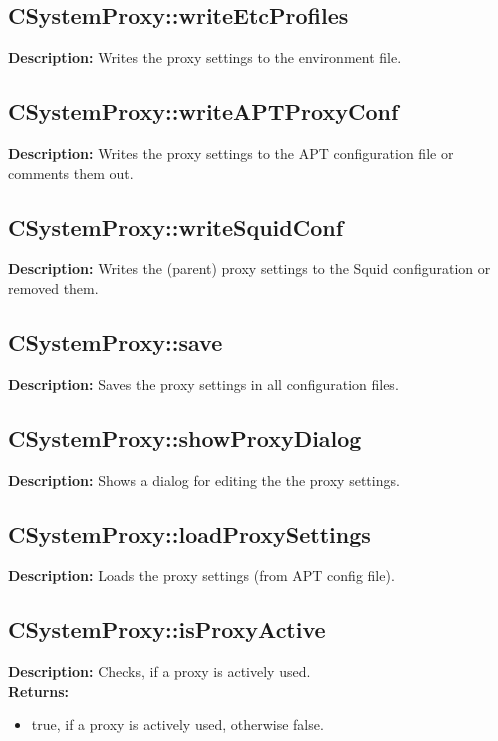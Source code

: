 \subsection{CSystemProxy::writeEtcProfiles}
\textbf{Description:} Writes the proxy settings to the environment file.\\

\subsection{CSystemProxy::writeAPTProxyConf}
\textbf{Description:} Writes the proxy settings to the APT configuration file or comments them out.\\

\subsection{CSystemProxy::writeSquidConf}
\textbf{Description:} Writes the (parent) proxy settings to the Squid configuration or removed them.\\

\subsection{CSystemProxy::save}
\textbf{Description:} Saves the proxy settings in all configuration files.\\

\subsection{CSystemProxy::showProxyDialog}
\textbf{Description:} Shows a dialog for editing the the proxy settings.\\

\subsection{CSystemProxy::loadProxySettings}
\textbf{Description:} Loads the proxy settings (from APT config file).\\

\subsection{CSystemProxy::isProxyActive}
\textbf{Description:} Checks, if a proxy is actively used.\\
\textbf{Returns:}
\begin{itemize}
\item true, if a proxy is actively used, otherwise false.
\end{itemize}

